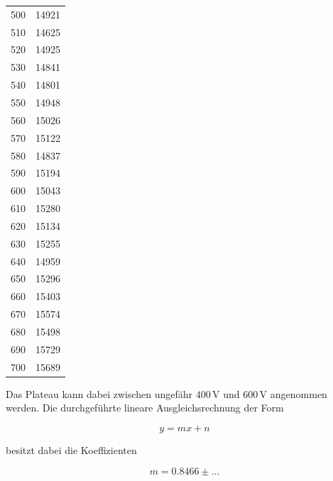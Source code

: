 \begin{table}[H]
\begin{tabular}{S[table-format=3.0] S[table-format=5.0]}
        500         &           14921           \\
        510         &           14625           \\
        520         &           14925           \\
        530         &           14841           \\
        540         &           14801           \\
        550         &           14948           \\
        560         &           15026           \\
        570         &           15122           \\
        580         &           14837           \\
        590         &           15194           \\
        600         &           15043           \\
        610         &           15280           \\
        620         &           15134           \\
        630         &           15255           \\
        640         &           14959           \\
        650         &           15296           \\
        660         &           15403           \\
        670         &           15574           \\
        680         &           15498           \\
        690         &           15729           \\
        700         &           15689           \\
    \bottomrule
    \end{tabular}
\end{table}

Das Plateau kann dabei zwischen ungefähr $400 \,\unit{\volt}$ und $600 \,\unit{\volt}$ angenommen werden.
Die durchgeführte lineare Ausgleichsrechnung der Form

\begin{equation*}
      y = m x + n
\end{equation*}

besitzt dabei die Koeffizienten

\begin{equation*}
      m = 0.8466 \pm ...
\end{equation*}

